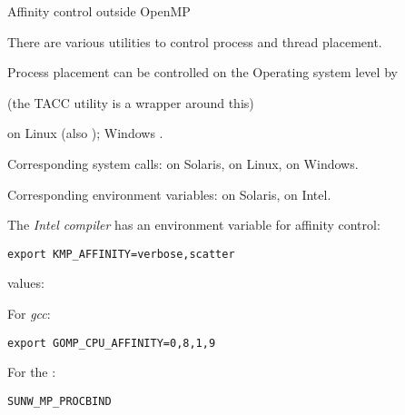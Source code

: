  {Affinity control outside OpenMP}

There are various utilities to control process and thread placement.

Process placement can be controlled on the Operating system level by
\begin{tacc}
(the TACC utility  is a wrapper around this)
\end{tacc}
on Linux (also ); Windows
.

Corresponding system calls:  on Solaris,
 on Linux,
 on Windows.

Corresponding environment variables:  on
Solaris,  on Intel.

The \emph{Intel compiler} has an
environment variable for affinity control:
\begin{verbatim}
export KMP_AFFINITY=verbose,scatter
\end{verbatim}
values: 

For \emph{gcc}:
\begin{verbatim}
export GOMP_CPU_AFFINITY=0,8,1,9
\end{verbatim}

For the :
\begin{verbatim}
SUNW_MP_PROCBIND
\end{verbatim}

